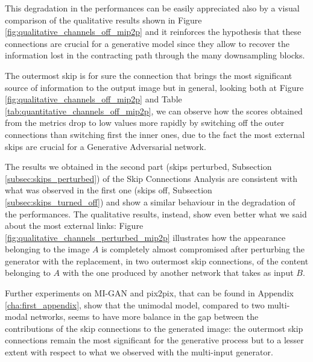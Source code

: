 This degradation in the performances can be easily appreciated also by a visual comparison of the qualitative results shown in Figure \ref{fig:qualitative_channels_off_mip2p} and it reinforces the hypothesis that these connections are crucial for a generative model since they allow to recover the information lost in the contracting path through the many downsampling blocks.

\vspace{5mm}
The outermost skip is for sure the connection that brings the most significant source of information to the output image but in general, looking both at Figure \ref{fig:qualitative_channels_off_mip2p} and Table \ref{tab:quantitative_channels_off_mip2p}, we can observe how the scores obtained from the metrics drop to low values more rapidly by switching off the outer connections than switching first the inner ones, due to the fact the most external skips are crucial for a Generative Adversarial network.

\vspace{5mm}
The results we obtained in the second part (skips perturbed, Subsection \ref{subsec:skips_perturbed}) of the Skip Connections Analysis are consistent with what was observed in the first one (skips off, Subsection \ref{subsec:skips_turned_off}) and show a similar behaviour in the degradation of the performances. 
The qualitative results, instead, show even better what we said about the most external links: Figure \ref{fig:qualitative_channels_perturbed_mip2p} illustrates how the appearance belonging to the image $A$ is completely almost compromised after perturbing the generator with the replacement, in two outermost skip connections, of the content belonging to $A$ with the one produced by another network that takes as input $B$.

\vspace{5mm}
Further experiments on MI-GAN and pix2pix, that can be found in Appendix \ref{cha:first_appendix}, show that the unimodal model, compared to two multi-modal networks, seems to have more balance in the gap between the contributions of the skip connections to the generated image: the outermost skip connections remain the most significant for the generative process but to a lesser extent with respect to what we observed with the multi-input generator. 

